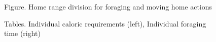 \documentclass[11pt,oneside,a4paper,openright]{report}
\begin{document}

 




\begin{figure}[h]
\centering
\setlength\fboxsep{0pt}
\setlength\fboxrule{0.5pt}
\caption{Figure. Home range division for foraging and moving home actions}
\label{fig:sectorsDivision}
\end{figure}



\begin{figure}[h]
\centering
\setlength\fboxsep{0pt}
\setlength\fboxrule{0.5pt}
\caption{Tables. Individual caloric requirements (left), Individual foraging time (right)}
\label{fig:caloricRequ}
\end{figure}
\end{document}
